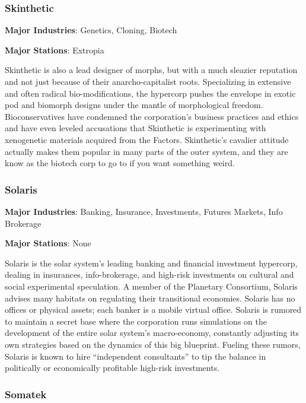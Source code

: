 \subsubsection{Skinthetic}
\label{sec:skinthetic}

\textbf{Major Industries}: Genetics, Cloning, Biotech

\textbf{Major Stations}: Extropia


Skinthetic is also a lead designer of morphs, but with a much sleazier
reputation and not just because of their anarcho-capitalist
roots. Specializing in extensive and often radical bio-modifications,
the hypercorp pushes the envelope in exotic pod and biomorph designs
under the mantle of morphological freedom.  Bioconservatives have
condemned the corporation's business practices and ethics and have
even leveled accusations that Skinthetic is experimenting with
xenogenetic materials acquired from the Factors.  Skinthetic's
cavalier attitude actually makes them popular in many parts of the
outer system, and they are know as the biotech corp to go to if you
want something weird.

\subsubsection{Solaris}
\label{sec:solaris}

\textbf{Major Industries}: Banking, Insurance, Investments, Futures Markets, Info Brokerage

\textbf{Major Stations}: None


Solaris is the solar system's leading banking and financial investment
hypercorp, dealing in insurances, info-brokerage, and high-risk
investments on cultural and social experimental speculation. A member
of the Planetary Consortium, Solaris advises many habitats on
regulating their transitional economies. Solaris has no offices or
physical assets; each banker is a mobile virtual office. Solaris is
rumored to maintain a secret base where the corporation runs
simulations on the development of the entire solar system's
macro-economy, constantly adjusting its own strategies based on the
dynamics of this big blueprint. Fueling these rumors, Solaris is known
to hire “independent consultants” to tip the balance in politically or
economically profitable high-risk investments.

\subsubsection{Somatek}
\label{sec:somatek}

